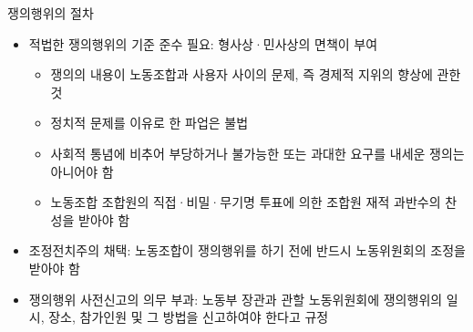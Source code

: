 \documentclass[aspectratio=169,xcolor=dvipsnames,handout]{beamer}
\begin{document}
\begin{frame}[allowframebreaks]{쟁의행위의 절차}
    \begin{itemize}[<+->]
        \item 적법한 쟁의행위의 기준 준수 필요: 형사상·민사상의 면책이 부여
        \begin{itemize}[<+->]
            \item 쟁의의 내용이 노동조합과 사용자 사이의 문제, 즉 경제적 지위의 향상에 관한 것
            \item 정치적 문제를 이유로 한 파업은 불법
            \item 사회적 통념에 비추어 부당하거나 불가능한 또는 과대한 요구를 내세운 쟁의는 아니어야 함
            \item 노동조합 조합원의 직접·비밀·무기명 투표에 의한 조합원 재적 과반수의 찬성을 받아야 함
        \end{itemize}
    \item 조정전치주의 채택: 노동조합이 쟁의행위를 하기 전에 반드시 노동위원회의 조정을 받아야 함
    \item 쟁의행위 사전신고의 의무 부과: 노동부 장관과 관할 노동위원회에 쟁의행위의 일시, 장소, 참가인원 및 그 방법을 신고하여야 한다고 규정
    \end{itemize}
\end{frame}
\end{document}
